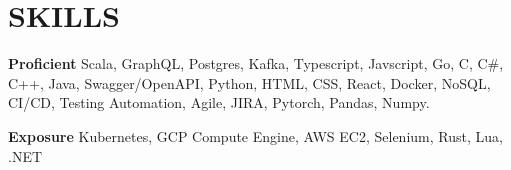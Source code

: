 \documentclass[9pts]{article}
\begin{document}
\section*{SKILLS}
{\large \bf Proficient}
Scala, GraphQL, Postgres, Kafka, Typescript, Javscript, Go, C, C\#, C++, Java,
Swagger/OpenAPI, Python, HTML, CSS, React, Docker, NoSQL, CI/CD, Testing
Automation, Agile, JIRA, Pytorch, Pandas, Numpy.

{\large \bf Exposure}
Kubernetes, GCP Compute Engine, AWS EC2, Selenium, Rust, Lua, .NET
\end{document}
